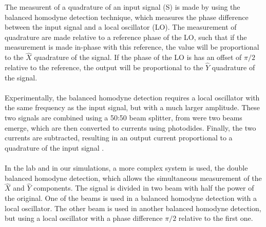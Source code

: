 The measurent of a quadrature of an input signal (S) is made by using the balanced homodyne detection technique, which measures the phase difference between the input signal and a local oscillator (LO). The measurement of quadrature are made relative to a reference phase of the LO, such that if the measurement is made in-phase with this reference, the value will be proportional to the $\hat{X}$ quadrature of the signal. If the phase of the LO is has an offset of $\pi/2$ relative to the reference, the output will be proportional to the $\hat{Y}$ quadrature of the signal.\\
\\
Experimentally, the balanced homodyne detection requires a local oscillator with the same frequency as the input signal, but with a much larger amplitude. These two signals are combined using a 50:50 beam splitter, from were two beams emerge, which are then converted to currents using photodides. Finally, the two currents are subtracted, resulting in an output current proportional to a quadrature of the input signal
\cite{fox2006}.\\
%
\\
In the lab and in our simulations, a more complex system is used, the double balanced homodyne detection, which allows the simultaneous measurement of the $\hat{X}$ and $\hat{Y}$ components. The signal is divided in two beam with half the power of the original. One of the beams is used in a balanced homodyne detection with a local oscillator. The other beam is used in another balanced homodyne detection, but using a local oscillator with a phase difference $\pi/2$ relative to the first one.
